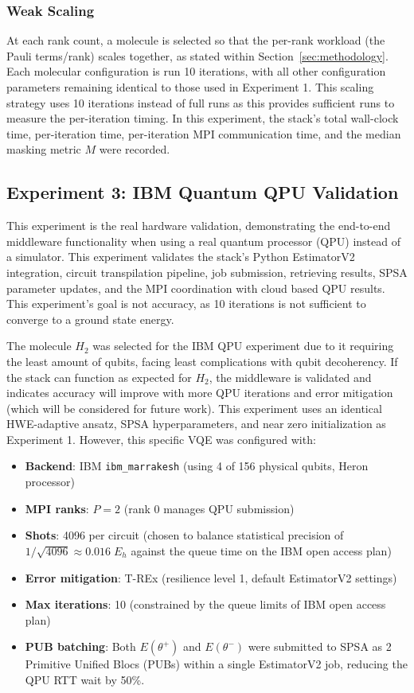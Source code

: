 \subsubsection{Weak Scaling}
At each rank count, a molecule is selected so that the per-rank workload (the Pauli terms/rank) scales together, as stated within Section~\ref{sec:methodology}.   
Each molecular configuration is run 10 iterations, with all other configuration parameters remaining identical to those used 
in Experiment 1. This scaling strategy uses 10 iterations instead of full runs as this provides sufficient runs to measure the per-iteration timing. 
In this experiment, the stack's total wall-clock time, per-iteration time, per-iteration MPI communication time, and the median masking metric $M$ were recorded. 

\subsection{Experiment 3: IBM Quantum QPU Validation}   
This experiment is the real hardware validation, demonstrating the end-to-end middleware functionality when using a real quantum 
processor (QPU) instead of a simulator. This experiment validates the stack's Python EstimatorV2 integration, circuit transpilation pipeline, job submission, retrieving results, SPSA parameter updates,  
and the MPI coordination with cloud based QPU results. This experiment's goal is not accuracy, as 10 iterations is not sufficient to converge to a ground state energy. 

The molecule $H_{2}$ was selected for the IBM QPU experiment due to it requiring the least amount of qubits,
facing least complications with qubit decoherency. If the stack can function as expected for $H_2$, the 
middleware is validated and indicates accuracy will improve with more QPU iterations and error mitigation (which will be considered for future work).
This experiment uses an identical HWE-adaptive ansatz, SPSA hyperparameters, 
and near zero initialization as Experiment 1. However, this specific VQE was configured with:
\begin{itemize}
    \item \textbf{Backend}: IBM \texttt{ibm\_marrakesh} (using 4 of 156 physical qubits, Heron processor)\parencite{rallis2025interfacingquantumcomputingsystems}
    \item \textbf{MPI ranks}: $P=2$ (rank 0 manages QPU submission)
    \item \textbf{Shots}: 4096 per circuit (chosen to balance statistical precision of $1/\sqrt{4096} \approx 0.016\;E_h$ against the queue time on the IBM open access plan)
    \item \textbf{Error mitigation}: T-REx (resilience level 1, default EstimatorV2 settings)\parencite{cai2023quantumerrormitigation}
    \item \textbf{Max iterations}: 10 (constrained by the queue limits of IBM open access plan)
    \item \textbf{PUB batching}: Both $E(\theta^+)$ and $E(\theta^-)$ were submitted to SPSA as 2 Primitive Unified Blocs (PUBs) within a single EstimatorV2 job, reducing the QPU RTT wait by 50\%. 
\end{itemize}

